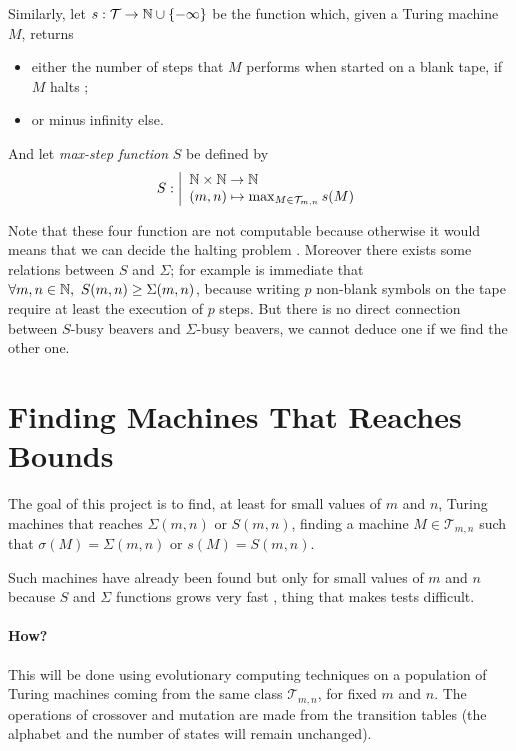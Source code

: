 \documentclass{article}
\begin{document}
Similarly, let $s : \mathcal{T} \to \mathbb{N} \cup \{-\infty\}$ be the function which, given a Turing machine $M$, returns
\begin{itemize}
\item either the number of steps that $M$ performs when started on a blank tape, if $M$ halts ;
\item or minus infinity else.
\end{itemize}

And let \emph{max-step function} $S$ be defined by
\[
S : \left |
\begin{array}{l}
  \mathbb{N} \times \mathbb{N} \to \mathbb{N}\\
(m,n) \mapsto \max_{M \in \mathcal{T}_{m,n}} s(M)
\end{array}
\right .
\]

Note that these four function are not computable because otherwise it would means that we can decide the halting problem \cite{rado}. Moreover there exists some relations between $S$ and $\Sigma$; for example is immediate that $\forall m,n \in \mathbb{N},\ S(m,n) \geq \Sigma(m,n)$, because writing $p$ non-blank symbols on the tape require at least the execution of $p$ steps. But there is no direct connection between $S$-busy beavers and $\Sigma$-busy beavers, \ie we cannot deduce one if we find the other one.

\section{Finding Machines That Reaches Bounds}

The goal of this project is to find, at least for small values of $m$ and $n$, Turing machines that reaches $\Sigma(m,n)$ or $S(m,n)$, \ie finding a machine $M \in \mathcal{T}_{m,n}$ such that $\sigma(M) = \Sigma(m,n)$ or $s(M) = S(m,n)$.

Such machines have already been found \cite{rado} but only for small values of $m$ and $n$ because $S$ and $\Sigma$ functions grows very fast \cite{rado}, thing that makes tests difficult.


\paragraph{How?} This will be done using evolutionary computing techniques on a population of Turing machines coming from the same class $\mathcal{T}_{m,n}$, for fixed $m$ and $n$. The operations of crossover and mutation are made from the transition tables (the alphabet and the number of states will remain unchanged).
\end{document}
